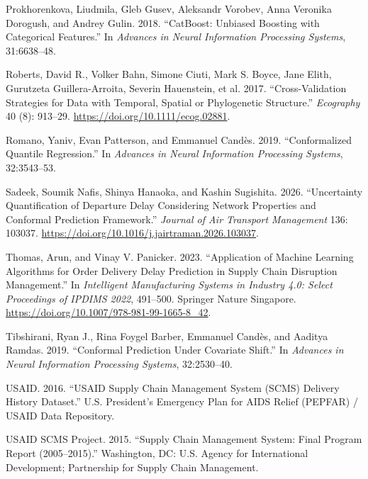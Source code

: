 \documentclass[
]{article}
\newlength{\cslhangindent}
\newenvironment{CSLReferences}[2] %
 {\begin{list}{}{%
  \setlength{\itemindent}{0pt}
  \setlength{\leftmargin}{0pt}
  \setlength{\parsep}{0pt}
  \ifodd #1
   \setlength{\leftmargin}{\cslhangindent}
   \setlength{\itemindent}{-1\cslhangindent}
  \fi
  \setlength{\itemsep}{#2\baselineskip}}}
 {\end{list}}
\begin{document}
\begin{CSLReferences}{1}{0}
Prokhorenkova, Liudmila, Gleb Gusev, Aleksandr Vorobev, Anna Veronika
Dorogush, and Andrey Gulin. 2018. {``CatBoost: Unbiased Boosting with
Categorical Features.''} In \emph{Advances in Neural Information
Processing Systems}, 31:6638--48.

Roberts, David R., Volker Bahn, Simone Ciuti, Mark S. Boyce, Jane Elith,
Gurutzeta Guillera-Arroita, Severin Hauenstein, et al. 2017.
{``Cross-Validation Strategies for Data with Temporal, Spatial or
Phylogenetic Structure.''} \emph{Ecography} 40 (8): 913--29.
\url{https://doi.org/10.1111/ecog.02881}.

Romano, Yaniv, Evan Patterson, and Emmanuel Candès. 2019.
{``Conformalized Quantile Regression.''} In \emph{Advances in Neural
Information Processing Systems}, 32:3543--53.

Sadeek, Soumik Nafis, Shinya Hanaoka, and Kashin Sugishita. 2026.
{``Uncertainty Quantification of Departure Delay Considering Network
Properties and Conformal Prediction Framework.''} \emph{Journal of Air
Transport Management} 136: 103037.
\url{https://doi.org/10.1016/j.jairtraman.2026.103037}.

Thomas, Arun, and Vinay V. Panicker. 2023. {``Application of Machine
Learning Algorithms for Order Delivery Delay Prediction in Supply Chain
Disruption Management.''} In \emph{Intelligent Manufacturing Systems in
Industry 4.0: Select Proceedings of IPDIMS 2022}, 491--500. Springer
Nature Singapore. \url{https://doi.org/10.1007/978-981-99-1665-8_42}.

Tibshirani, Ryan J., Rina Foygel Barber, Emmanuel Candès, and Aaditya
Ramdas. 2019. {``Conformal Prediction Under Covariate Shift.''} In
\emph{Advances in Neural Information Processing Systems}, 32:2530--40.

USAID. 2016. {``USAID Supply Chain Management System (SCMS) Delivery
History Dataset.''} U.S. President's Emergency Plan for AIDS Relief
(PEPFAR) / USAID Data Repository.

USAID SCMS Project. 2015. {``Supply Chain Management System: Final
Program Report (2005--2015).''} Washington, DC: U.S. Agency for
International Development; Partnership for Supply Chain Management.


\end{CSLReferences}
\end{document}
